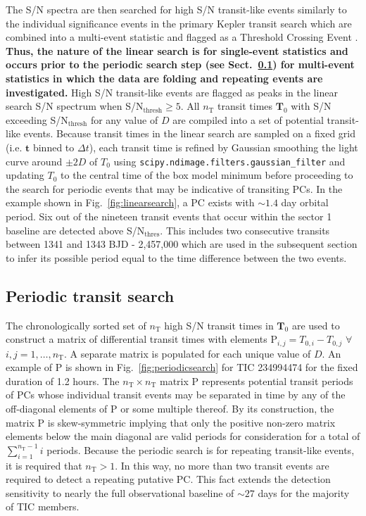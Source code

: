 The S/N spectra are then searched for high S/N transit-like events similarly to the individual
significance events in the primary Kepler transit search which are combined into a multi-event
statistic and flagged as a Threshold Crossing Event \citep{jenkins10}.
\textbf{Thus, the nature of the linear search is for single-event statistics and occurs prior
  to the periodic search step (see Sect.~\ref{sect:periodic}) for multi-event statistics in
  which the data are folding and repeating events are investigated.}
High S/N transit-like events are flagged as peaks in the linear search S/N spectrum when
S/N$_{\text{thresh}}\geq 5$.
All $n_{\text{T}}$ transit times $\mathbf{T}_0$ with S/N exceeding S/N$_{\text{thresh}}$ for
any value of $D$ are compiled into a set of potential transit-like events.
Because transit times in the linear search are sampled on a fixed grid (i.e.
$\mathbf{t}$ binned to $\Delta t$), each transit time is refined by Gaussian smoothing the light curve
around $\pm 2D$ of $T_0$ using \texttt{scipy.ndimage.filters.gaussian\_filter} and updating $T_0$ to the
central time of the box model minimum before proceeding to the search for periodic events that may
be indicative of transiting PCs. In the example shown in Fig.~\ref{fig:linearsearch},
a PC exists with $\sim 1.4$ day orbital period. Six out of the nineteen transit events
that occur within the sector 1 baseline are detected above S/N$_{\text{thres}}$. This includes two
consecutive transits between 1341 and 1343 BJD - 2,457,000 which are used in the subsequent
section to infer its possible period equal to the time difference between the two events.  \\


\subsection{Periodic transit search} \label{sect:periodic}
The chronologically sorted set of $n_{\text{T}}$ high S/N transit times in $\mathbf{T}_0$
are used to construct a matrix of differential transit times with
elements P$_{i,j} = T_{0,i} - T_{0,j}$ $\forall$ $i,j=1,\dots,n_{\text{T}}$.
A separate matrix is populated for each unique value of $D$. An example of
P is shown in Fig.~\ref{fig:periodicsearch} for TIC 234994474 for the fixed duration of 1.2 hours. 
The $n_{\text{T}} \times n_{\text{T}}$ matrix P represents potential transit periods of
PCs whose individual transit events
may be separated in time by any of the off-diagonal elements of P or some multiple thereof.
By its construction, the matrix P is skew-symmetric implying that only the positive non-zero matrix elements
below the main diagonal are valid periods for consideration for a total of $\sum_{i=1}^{n_{\text{T}}-1}i$ periods.
Because the periodic search is for repeating transit-like events, it is required that $n_{\text{T}}>1$. In this
way, no more than two transit events are required to detect a repeating putative 
PC. This fact extends the \pipeline{} detection sensitivity to nearly the full observational baseline
of $\sim 27$ days for the majority of TIC members. \\


